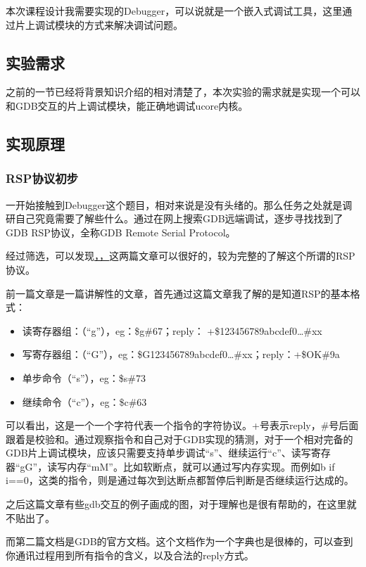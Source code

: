 本次课程设计我需要实现的Debugger，可以说就是一个嵌入式调试工具，这里通过片上调试模块的方式来解决调试问题。

\subsection{实验需求}
之前的一节已经将背景知识介绍的相对清楚了，本次实验的需求就是实现一个可以和GDB交互的片上调试模块，能正确地调试ucore内核。

\subsection{实现原理}

\subsubsection{RSP协议初步}
一开始接触到Debugger这个题目，相对来说是没有头绪的。那么任务之处就是调研自己究竟需要了解些什么。通过在网上搜索GDB远端调试，逐步寻找找到了GDB RSP协议，全称GDB Remote Serial Protocol。

经过筛选，可以发现\href{http://www.embecosm.com/appnotes/ean4/embecosm-howto-rsp-server-ean4-issue-2.html}，\href{https://sourceware.org/gdb/onlinedocs/gdb/Remote-Protocol.html}，这两篇文章可以很好的，较为完整的了解这个所谓的RSP协议。

前一篇文章是一篇讲解性的文章，首先通过这篇文章我了解的是知道RSP的基本格式：
\begin{itemize}
\item 读寄存器组：（“g”），eg：\$g\#67；reply： +\$123456789abcdef0…\#xx
\item 写寄存器组：（“G”），eg：\$G123456789abcdef0…\#xx；reply：+\$OK\#9a
\item 单步命令（“s”），eg：\$s\#73
\item 继续命令（“c”），eg：\$c\#63
\end{itemize}

可以看出，这是一个一个字符代表一个指令的字符协议。+号表示reply，\#号后面跟着是校验和。通过观察指令和自己对于GDB实现的猜测，对于一个相对完备的GDB片上调试模块，应该只需要支持单步调试“s”、继续运行“c”、读写寄存器“gG”，读写内存“mM”。比如软断点，就可以通过写内存实现。而例如b if i==0，这类的指令，则是通过每次到达断点都暂停后判断是否继续运行达成的。

之后这篇文章有些gdb交互的例子画成的图，对于理解也是很有帮助的，在这里就不贴出了。

而第二篇文档是GDB的官方文档。这个文档作为一个字典也是很棒的，可以查到你通讯过程用到所有指令的含义，以及合法的reply方式。

